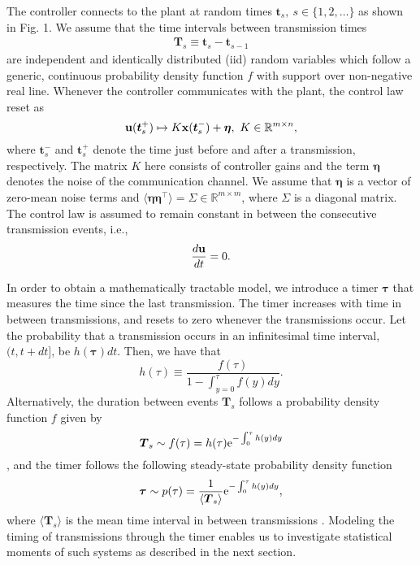 \documentclass[letterpaper, 10 pt,one column, conference]{ieeeconf}  %
\begin{document}
The controller connects to the plant at random times $\boldsymbol{t}_s, \ s\in \{1,2,\ldots\}$ as shown in Fig. 1. We assume that the time intervals between transmission times
\begin{align}
\boldsymbol T_s  \equiv   \boldsymbol t_s - \boldsymbol  t_{s-1}\label{pdf of T}
\end{align}
are independent and identically distributed (iid) random variables which follow a generic, continuous probability density function $f$ with support over non-negative real line. Whenever the controller communicates with the plant, the control law reset as
\begin{equation}
\bold u (\boldsymbol t_s^+) \mapsto K \bold x(\boldsymbol  t_s^-)+\boldsymbol \eta, \ K\in  \mathbb{R}^{m\times n} ,\label{reset}
\end{equation}
where $\boldsymbol t_s^-$ and $\boldsymbol t_s^+$ denote the time just before and after a transmission, respectively. The matrix $K$ here consists of controller gains and the term $\boldsymbol \eta$ denotes the noise of the communication channel. We assume that $\boldsymbol \eta$ is a vector of zero-mean noise terms and $\langle \boldsymbol \eta \boldsymbol \eta^\top \rangle = \Sigma \in \mathbb{R}^{m\times m} $, where $\Sigma$ is a diagonal matrix. The control law is assumed to remain constant in between the consecutive transmission events, i.e.,
\begin{equation}
\frac{d\bold u}{dt} =0. \label{control law}
\end{equation}


In order to obtain a mathematically tractable model, we introduce a timer $\boldsymbol \tau$ that measures the time since the last transmission. The timer increases with time in between transmissions, and resets to zero whenever the transmissions occur. Let the 
probability that a transmission occurs in an infinitesimal time interval, $(t,t+dt]$, be $h(\boldsymbol \tau)dt$. Then, we have that
\begin{equation} \label{hr}
h( \tau ) \equiv   \frac{f(\tau)}{1-\int_{y=0}^{\tau}f(y)dy}.
\end{equation}
Alternatively, the duration between events $\boldsymbol T_s$ follows a probability density function $f$ given by
\begin{equation}
\boldsymbol T_s \sim  f(\tau) = h(\tau )  {\rm e}^{-\int_0^{\tau} h(y) d y}
\end{equation}
\cite{Ross20109,ehp00}, and the timer follows the following steady-state probability density function 
\begin{equation}
\boldsymbol \tau \sim  p(\tau) = \frac{1}{\langle \boldsymbol T_s\rangle} {\rm e}^{-\int_0^{\tau} h(y) d y}, \label{prob. tau}
\end{equation}
where $\langle \boldsymbol T_s\rangle$ is the mean time interval in between transmissions \cite{vss16}. Modeling the timing of transmissions through the timer enables us to investigate statistical moments of such systems as described in the next section. 
\end{document}
